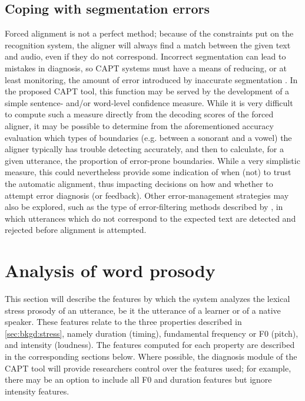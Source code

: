 
	\subsection{Coping with segmentation errors}
	\label{sec:segmentation:errors}
	
	Forced alignment is not a perfect method; because of the constraints put on the recognition system, the aligner will always find a match between the given text and audio, even if they do not correspond. Incorrect segmentation can lead to mistakes in diagnosis, so CAPT systems must have a means of reducing, or at least monitoring, the amount of error introduced by inaccurate segmentation \citep{Eskenazi2009}. 	
	In the proposed CAPT tool, this function may be served by the development of a simple sentence- and/or word-level confidence measure. 
	While it is very difficult to compute such a measure directly from the decoding scores of the forced aligner, it may be possible to determine from the aforementioned accuracy evaluation which types of boundaries (e.g. between a sonorant and a vowel) the aligner typically has trouble detecting accurately, and then to calculate, for a given utterance, the proportion of error-prone boundaries. While a very simplistic measure, this could nevertheless provide some indication of when (not) to trust the automatic alignment, thus impacting decisions on how and whether to attempt error diagnosis (or feedback).
	Other error-management strategies may also be explored, such as the type of error-filtering methods described by \textcite{Mesbahi2011,Bonneau2012,Orosanu2012}, in which utterances which do not correspond to the expected text are detected and rejected before alignment is attempted.
	
\section{Analysis of word prosody}
\label{sec:diag:prosody}

	This section will describe the features by which the system analyzes the lexical stress prosody of an utterance, be it the utterance of a learner or of a native speaker. These features relate to the three properties described in \cref{sec:bkgd:stress}, namely duration (timing), fundamental frequency or F0 (pitch), and intensity (loudness). 
		The features computed for each property are described in the corresponding sections below.
%
	Where possible, the diagnosis module of the CAPT tool will provide researchers control over the features used; for example, there may be an option to include all F0 and duration features but ignore intensity features.
%	



